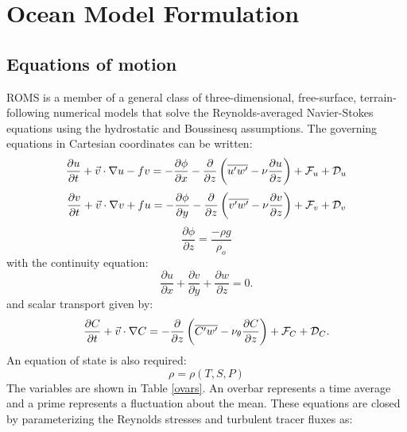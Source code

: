 \section{Ocean Model Formulation}
\label{Phys}
\subsection {Equations of motion}
ROMS is a member of a general class of three-dimensional,
free-surface, terrain-following numerical models that solve the
Reynolds-averaged Navier-Stokes equations using the hydrostatic and
Boussinesq assumptions.
The governing equations in Cartesian coordinates can be written:
\begin{equation}
   \frac{\partial u}{\partial t} + \vec{v} \cdot \nabla u - fv =
   - \frac{\partial \phi}{\partial x}
   - \frac{\partial} {\partial z}
   \left( \overline{u'w'} - \nu \frac{\partial u}{\partial z} \right)
   + {\cal F}_u + {\cal D}_u
\label{st1}
\end{equation}
\begin{equation}
   \frac{\partial v}{\partial t} + \vec{v} \cdot \nabla v + fu =
   - \frac{\partial \phi}{\partial y}
   - \frac{\partial}{\partial z} \left( \overline{v'w'} -
   \nu \frac{\partial v}{\partial z} \right) 
    + {\cal F}_v + {\cal D}_v
\label{st2}
\end{equation}
\begin{equation}
 \frac{\partial \phi}{\partial z} = \frac{-\rho g}{\rho_o}
\label{st4}
\end{equation}
with the continuity equation:
\begin{equation}
  \frac{\partial u}{\partial x} +
  \frac{\partial v}{\partial y} + \frac{\partial w}{\partial z} = 0.
\label{st5}
\end{equation}
and scalar transport given by:
\begin{equation}
  \frac {\partial C}{\partial t} + \vec{v} \cdot \nabla C
  = - \frac{\partial}{\partial z} \left( \overline{C'w'} -
  \nu_\theta \frac{\partial C}{\partial z} \right) +
  {\cal F}_C + {\cal D}_C.
\label{st3a}
\end{equation}
An equation of state is also required:
\begin{equation}
   \rho = \rho(T,S,P)
\label{st3c}
\end{equation}
The variables are shown in Table \ref{ovars}.
An overbar represents a time average and a prime represents a
fluctuation about the mean. These equations are closed by
parameterizing the Reynolds stresses and turbulent tracer fluxes as:
